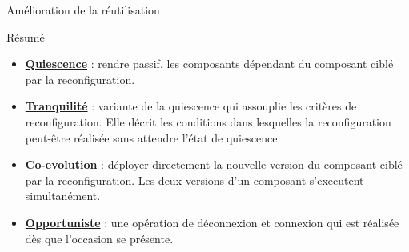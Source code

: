 \begin{frame}{Amélioration de la réutilisation}
\end{frame}

\begin{frame}{Résumé}
\begin{itemize}
\setlength\itemsep{0.7cm}
\item \underline{\textbf{Quiescence}} : rendre passif,
les composants dépendant du composant ciblé par la reconfiguration. 
\item \underline{\textbf{Tranquilité}} : variante de la quiescence qui assouplie
les critères de reconfiguration. Elle décrit les conditions dans
lesquelles la reconfiguration peut-être réalisée sans attendre l'état de
quiescence
\item \underline{\textbf{Co-evolution}} : déployer directement la nouvelle version du composant ciblé par la
reconfiguration. Les deux versions d'un
composant s'executent simultanément. 
\item \underline{\textbf{Opportuniste}} : une opération de
déconnexion et connexion qui est réalisée dès que l'occasion se
présente.  
\end{itemize}
\end{frame}
